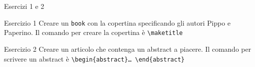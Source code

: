 \begin{frame}[fragile]{Esercizi 1 e 2}

\begin{block}{Esercizio 1}
	Creare un \texttt{book} con la copertina specificando gli autori Pippo e
	Paperino. Il comando per creare la copertina è
	\texttt{\textbackslash{}maketitle}
\end{block}

\begin{block}{Esercizio 2}
	Creare un articolo che contenga un abstract a piacere. Il comando per
	scrivere un abstract è \texttt{\textbackslash{}begin\{abstract\}\dots{}
	\textbackslash{}end\{abstract\}}
\end{block}

\end{frame}